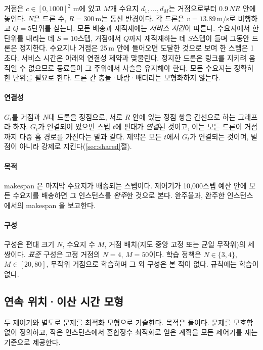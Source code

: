 \documentclass[final,5p,times,twocolumn]{elsarticle}
\begin{document}
거점은 $c \in [0,1000]^2$ m에 있고 $M$개 수요지 $d_1,\dots,d_M$는 거점으로부터 $0.9\,N R$
안에 놓인다. $N$은 드론 수, $R = 300$\,m는 통신 반경이다. 각 드론은 $v = 13.89$\,m/s로 비행하고
$Q = 5$단위를 싣는다. 모든 배송과 재적재에는 \emph{서비스 시간}이 따른다. 수요지에서 한 단위를
내리는 데 $S = 10$스텝, 거점에서 $Q$까지 재적재하는 데 $S$스텝이 들며 그동안 드론은 정지한다.
수요지나 거점은 25\,m 안에 들어오면 도달한 것으로 보며 한 스텝은 1초다. 서비스 시간은 아래의
연결성 제약과 맞물린다. 정지한 드론은 링크를 지키려 움직일 수 없으므로 동료들이 그 주위에서 사슬을
유지해야 한다. 모든 수요지는 정확히 한 단위를 필요로 한다. 드론 간 충돌·바람·배터리는 모형화하지
않는다.

\paragraph{연결성}
$G_t$를 거점과 $N$대 드론을 정점으로, 서로 $R$ 안에 있는 정점 쌍을 간선으로 하는 그래프라 하자.
$G_t$가 연결되어 있으면 스텝 $t$에 편대가 \emph{연결}된 것이고, 이는 모든 드론이 거점까지 다중 홉
경로를 가진다는 말과 같다. 제약은 모든 $t$에서 $G_t$가 연결되는 것이며, 벌점이 아니라 강제로
지킨다(\ref{sec:shared}절).

\paragraph{목적}
makespan 은 마지막 수요지가 배송되는 스텝이다. 제어기가 10{,}000스텝 예산 안에 모든 수요지를
배송하면 그 인스턴스를 \emph{완주}한 것으로 본다. 완주율과, 완주한 인스턴스에서의 makespan 을
보고한다.

\paragraph{구성}
구성은 편대 크기 $N$, 수요지 수 $M$, 거점 배치(지도 중앙 고정 또는 균일 무작위)의 세 쌍이다.
\emph{표준} 구성은 고정 거점의 $N=4$, $M=50$이다. 학습 정책은 $N \in \{3,4\}$, $M \in [20,80]$,
무작위 거점으로 학습하며 그 외 구성은 본 적이 없다. 규칙에는 학습이 없다.


\subsection{연속 위치·이산 시간 모형}
\label{sec:cont-model}
\label{sec:milp-model}

두 제어기와 별도로 문제를 최적화 모형으로 기술한다. 목적은 둘이다. 문제를 모호함 없이 정의하고, 작은
인스턴스에서 혼합정수 최적화로 얻은 계획을 모든 제어기를 재는 기준으로 제공한다.
\end{document}
